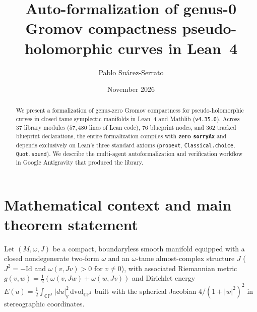 \documentclass[10pt]{article}
\title{\vspace{-1.8em}\textbf{Auto-formalization of genus-0 Gromov compactness pseudo-holomorphic curves in Lean~4}}
\author{Pablo Su\'arez-Serrato}
\date{November 2026\vspace{-1.0em}}
\renewcommand{\_}{\origus\allowbreak}
\newcommand{\CP}{\mathbb{CP}^1}
\newcommand{\code}[1]{\texttt{#1}}
\begin{document}
\maketitle

\begin{abstract}
\noindent
We present a formalization of genus-zero Gromov compactness for pseudo-holomorphic curves in
closed tame symplectic manifolds in Lean~4 and Mathlib (\code{v4.35.0}). 
Across 37 library modules ($57{,}480$ lines of Lean code), 76 blueprint nodes, and 362 tracked blueprint declarations, the
entire formalization compiles with \textbf{zero \code{sorryAx}} and depends exclusively on Lean's
three standard axioms (\code{propext}, \code{Classical.choice}, \code{Quot.sound}). 
We describe the multi-agent autoformalization and verification workflow in Google Antigravity that produced the library.
\end{abstract}


\section{Mathematical context and main theorem statement}

Let $(M, \omega, J)$ be a compact, boundaryless smooth manifold equipped with a closed nondegenerate
two-form $\omega$ and an $\omega$-tame almost-complex structure $J$ ($J^2 = -\mathrm{Id}$ and
$\omega(v, Jv) > 0$ for $v \ne 0$), with associated Riemannian metric
$g(v,w) = \tfrac{1}{2}(\omega(v,Jw) + \omega(w,Jv))$ and Dirichlet energy
$E(u) = \tfrac{1}{2}\int_{\CP} |du|_g^2\,\mathrm{dvol}_{\CP}$ built with the spherical Jacobian
$4/(1+|w|^2)^2$ in stereographic coordinates.
\end{document}
